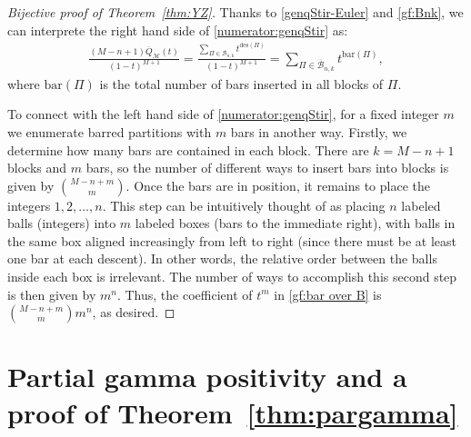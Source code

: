\documentclass[11pt,reqno]{amsart}
\numberwithin{equation}{section}
\theoremstyle{plain}
\theoremstyle{definition}
\newcommand{\M}{\mathcal{M}}
\newcommand{\B}{\mathcal{B}}
\def\des{\mathrm{des}}
\def\bar{\mathrm{bar}}
\begin{document}
\begin{proof}[Bijective proof of Theorem~\ref{thm:YZ}]
Thanks to \eqref{genqStir-Euler} and \eqref{gf:Bnk}, we can interprete the right hand side of \eqref{numerator:genqStir} as:
\begin{align}\label{gf:bar over B}
\frac{(M-n+1)\overline{Q}_{\M}(t)}{(1-t)^{M+1}} = \frac{\sum_{\Pi\in\B_{n,k}}t^{\des(\Pi)}}{(1-t)^{M+1}} = \sum_{\Pi\in\overline{\B}_{n,k}}t^{\bar(\Pi)},
\end{align}
where $\bar(\Pi)$ is the total number of bars inserted in all blocks of $\Pi$. 

To connect with the left hand side of \eqref{numerator:genqStir}, for a fixed integer $m$ we enumerate barred partitions with $m$ bars in another way. Firstly, we determine how many bars are contained in each block. There are $k=M-n+1$ blocks and $m$ bars, so the number of different ways to insert bars into blocks is given by $\binom{M-n+m}{m}$. Once the bars are in position, it remains to place the integers $1,2,\ldots,n$. This step can be intuitively thought of as placing $n$ labeled balls (integers) into $m$ labeled boxes (bars to the immediate right), with balls in the same box aligned increasingly from left to right (since there must be at least one bar at each descent). In other words, the relative order between the balls inside each box is irrelevant. The number of ways to accomplish this second step is then given by $m^n$. Thus, the coefficient of $t^m$ in \eqref{gf:bar over B} is $\binom{M-n+m}{m}m^n$, as desired.
\end{proof}


\section{Partial gamma positivity and a proof of Theorem~\ref{thm:pargamma}}
\end{document}
